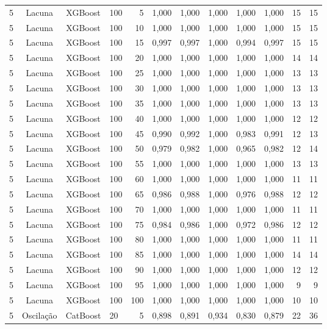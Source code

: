 \begin{longtable}{ccclrrrrrrrr}
5 & Lacuna & XGBoost & 100 & 5 & 1,000 & 1,000 & 1,000 & 1,000 & 1,000 & 15 & 15 \\
5 & Lacuna & XGBoost & 100 & 10 & 1,000 & 1,000 & 1,000 & 1,000 & 1,000 & 15 & 15 \\
5 & Lacuna & XGBoost & 100 & 15 & 0,997 & 0,997 & 1,000 & 0,994 & 0,997 & 15 & 15 \\
5 & Lacuna & XGBoost & 100 & 20 & 1,000 & 1,000 & 1,000 & 1,000 & 1,000 & 14 & 14 \\
5 & Lacuna & XGBoost & 100 & 25 & 1,000 & 1,000 & 1,000 & 1,000 & 1,000 & 13 & 13 \\
5 & Lacuna & XGBoost & 100 & 30 & 1,000 & 1,000 & 1,000 & 1,000 & 1,000 & 13 & 13 \\
5 & Lacuna & XGBoost & 100 & 35 & 1,000 & 1,000 & 1,000 & 1,000 & 1,000 & 13 & 13 \\
5 & Lacuna & XGBoost & 100 & 40 & 1,000 & 1,000 & 1,000 & 1,000 & 1,000 & 12 & 12 \\
5 & Lacuna & XGBoost & 100 & 45 & 0,990 & 0,992 & 1,000 & 0,983 & 0,991 & 12 & 13 \\
5 & Lacuna & XGBoost & 100 & 50 & 0,979 & 0,982 & 1,000 & 0,965 & 0,982 & 12 & 14 \\
5 & Lacuna & XGBoost & 100 & 55 & 1,000 & 1,000 & 1,000 & 1,000 & 1,000 & 13 & 13 \\
5 & Lacuna & XGBoost & 100 & 60 & 1,000 & 1,000 & 1,000 & 1,000 & 1,000 & 11 & 11 \\
5 & Lacuna & XGBoost & 100 & 65 & 0,986 & 0,988 & 1,000 & 0,976 & 0,988 & 12 & 12 \\
5 & Lacuna & XGBoost & 100 & 70 & 1,000 & 1,000 & 1,000 & 1,000 & 1,000 & 11 & 11 \\
5 & Lacuna & XGBoost & 100 & 75 & 0,984 & 0,986 & 1,000 & 0,972 & 0,986 & 12 & 12 \\
5 & Lacuna & XGBoost & 100 & 80 & 1,000 & 1,000 & 1,000 & 1,000 & 1,000 & 11 & 11 \\
5 & Lacuna & XGBoost & 100 & 85 & 1,000 & 1,000 & 1,000 & 1,000 & 1,000 & 14 & 14 \\
5 & Lacuna & XGBoost & 100 & 90 & 1,000 & 1,000 & 1,000 & 1,000 & 1,000 & 12 & 12 \\
5 & Lacuna & XGBoost & 100 & 95 & 1,000 & 1,000 & 1,000 & 1,000 & 1,000 & 9 & 9 \\
5 & Lacuna & XGBoost & 100 & 100 & 1,000 & 1,000 & 1,000 & 1,000 & 1,000 & 10 & 10 \\
5 & Oscilação & CatBoost & 20 & 5 & 0,898 & 0,891 & 0,934 & 0,830 & 0,879 & 22 & 36 \\

\end{longtable}
